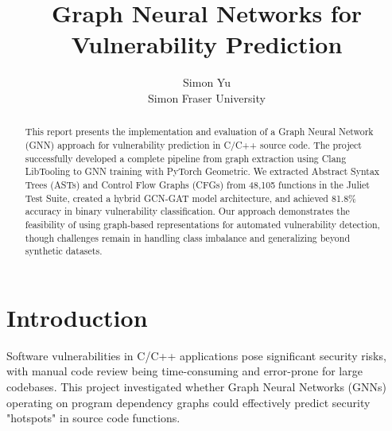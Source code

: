 



\date{}

\title{\Large \bf Graph Neural Networks for Vulnerability Prediction}

\author{
{\rm Simon Yu}\\
Simon Fraser University
} %

\maketitle

\begin{abstract}
This report presents the implementation and evaluation of a Graph Neural Network (GNN) approach for vulnerability prediction in C/C++ source code. The project successfully developed a complete pipeline from graph extraction using Clang LibTooling to GNN training with PyTorch Geometric. We extracted Abstract Syntax Trees (ASTs) and Control Flow Graphs (CFGs) from 48,105 functions in the Juliet Test Suite, created a hybrid GCN-GAT model architecture, and achieved 81.8\% accuracy in binary vulnerability classification. Our approach demonstrates the feasibility of using graph-based representations for automated vulnerability detection, though challenges remain in handling class imbalance and generalizing beyond synthetic datasets.
\end{abstract}


\section{Introduction}

Software vulnerabilities in C/C++ applications pose significant security risks, with manual code review being time-consuming and error-prone for large codebases. This project investigated whether Graph Neural Networks (GNNs) operating on program dependency graphs could effectively predict security "hotspots" in source code functions.

